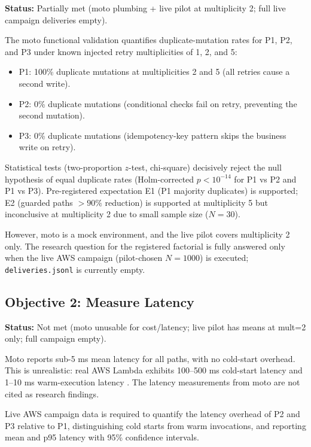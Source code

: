 \textbf{Status:} Partially met (moto plumbing + live pilot at multiplicity 2; full live campaign deliveries empty).

The moto functional validation quantifies duplicate-mutation rates for P1, P2, and P3 under known injected retry multiplicities of 1, 2, and 5:

\begin{itemize}
    \item P1: 100\% duplicate mutations at multiplicities 2 and 5 (all retries cause a second write).
    \item P2: 0\% duplicate mutations (conditional checks fail on retry, preventing the second mutation).
    \item P3: 0\% duplicate mutations (idempotency-key pattern skips the business write on retry).
\end{itemize}

Statistical tests (two-proportion $z$-test, chi-square) decisively reject the null hypothesis of equal duplicate rates (Holm-corrected $p < 10^{-14}$ for P1 vs P2 and P1 vs P3). Pre-registered expectation E1 (P1 majority duplicates) is supported; E2 (guarded paths $> 90\%$ reduction) is supported at multiplicity 5 but inconclusive at multiplicity 2 due to small sample size ($N = 30$).

However, moto is a mock environment, and the live pilot covers multiplicity 2 only. The research question for the registered factorial is fully answered only when the live AWS campaign (pilot-chosen $N = 1000$) is executed; \texttt{deliveries.jsonl} is currently empty.

\subsection{Objective 2: Measure Latency}

\textbf{Status:} Not met (moto unusable for cost/latency; live pilot has means at mult=2 only; full campaign empty).

Moto reports sub-5 ms mean latency for all paths, with no cold-start overhead. This is unrealistic: real AWS Lambda exhibits 100--500 ms cold-start latency and 1--10 ms warm-execution latency \citep{Scheuner2022CrossFit, Liu2023FaaSLight, Elhemali2022DynamoDB}. The latency measurements from moto are not cited as research findings.

Live AWS campaign data is required to quantify the latency overhead of P2 and P3 relative to P1, distinguishing cold starts from warm invocations, and reporting mean and p95 latency with 95\% confidence intervals.

